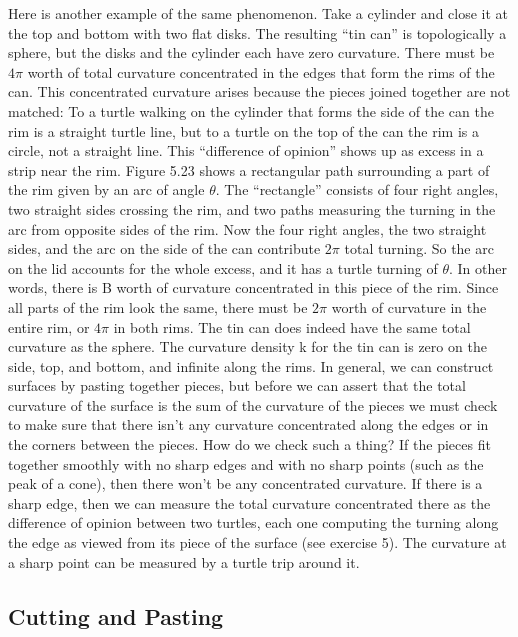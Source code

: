 \documentclass{book}
\begin{document}
Here is another example of the same phenomenon. Take a cylinder
and close it at the top and bottom with two flat disks. The resulting ``tin
can'' is topologically a sphere, but the disks and the cylinder each have
zero curvature. There must be $4 \pi$ worth of total curvature concentrated
in the edges that form the rims of the can. This concentrated curvature
arises because the pieces joined together are not matched: To a turtle
walking on the cylinder that forms the side of the can the rim is a straight
turtle line, but to a turtle on the top of the can the rim is a circle, not
a straight line. This ``difference of opinion'' shows up as excess in a
strip near the rim. Figure 5.23 shows a rectangular path surrounding
a part of the rim given by an arc of angle $\theta$. The ``rectangle'' consists
of four right angles, two straight sides crossing the rim, and two paths
measuring the turning in the arc from opposite sides of the rim. Now
the four right angles, the two straight sides, and the arc on the side
of the can contribute $2 \pi$ total turning. So the arc on the lid accounts
for the whole excess, and it has a turtle turning of $\theta$. In other words,
there is B worth of curvature concentrated in this piece of the rim. Since
all parts of the rim look the same, there must be $2 \pi$ worth of curvature
in the entire rim, or $4 \pi$ in both rims. The tin can does indeed have the
same total curvature as the sphere. The curvature density k for the tin
can is zero on the side, top, and bottom, and infinite along the rims.
In general, we can construct surfaces by pasting together pieces, but
before we can assert that the total curvature of the surface is the sum of
the curvature of the pieces we must check to make sure that there isn't
any curvature concentrated along the edges or in the corners between
the pieces. How do we check such a thing? If the pieces fit together
smoothly with no sharp edges and with no sharp points (such as the peak
of a cone), then there won't be any concentrated curvature. If there is a
sharp edge, then we can measure the total curvature concentrated there
as the difference of opinion between two turtles, each one computing
the turning along the edge as viewed from its piece of the surface (see
exercise 5). The curvature at a sharp point can be measured by a turtle
trip around it.

\subsection{Cutting and Pasting}
\end{document}

